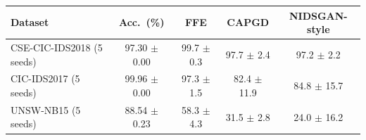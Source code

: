 \begin{tabular}{@{}lcccc@{}}
\toprule
\textbf{Dataset} & \textbf{Acc.\ (\%)} & \textbf{FFE} & \textbf{CAPGD} & \textbf{NIDSGAN-style} \\
\midrule
CSE-CIC-IDS2018 (5 seeds) & 97.30 $\pm$ 0.00 & 99.7 $\pm$ 0.3 & 97.7 $\pm$ 2.4 & 97.2 $\pm$ 2.2 \\
CIC-IDS2017 (5 seeds) & 99.96 $\pm$ 0.00 & 97.3 $\pm$ 1.5 & 82.4 $\pm$ 11.9 & 84.8 $\pm$ 15.7 \\
UNSW-NB15 (5 seeds) & 88.54 $\pm$ 0.23 & 58.3 $\pm$ 4.3 & 31.5 $\pm$ 2.8 & 24.0 $\pm$ 16.2 \\
\bottomrule
\end{tabular}
